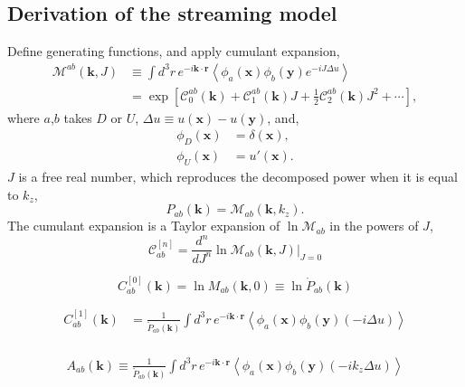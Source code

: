 \documentclass[a4paper,11pt, fleqn]{article}
\begin{document}
\newpage
\subsection{Derivation of the streaming model}


Define generating functions, and apply cumulant expansion,
\begin{align}
  \mathcal{M}^{ab}(\bm{k}, J) &\equiv
  \int \!\! d^3 r \, e^{-i\bm{k}\cdot\bm{r}} \left\langle
  \phi_a(\bm{x}) \phi_b(\bm{y}) e^{-iJ\Delta u} \right\rangle\\
  &= \exp\left[
    \mathcal{C}_0^{ab}(\bm{k}) +
    \mathcal{C}_1^{ab}(\bm{k}) J +
    \frac{1}{2} \mathcal{C}_2^{ab}(\bm{k}) J^2 + \cdots
    \right],
\end{align}
where $a$,$b$ takes $D$ or $U$, $\Delta u \equiv u(\bm{x}) - u(\bm{y})$, and,
\begin{align}
  \phi_D(\bm{x}) &= \delta(\bm{x}),\\
  \phi_U(\bm{x}) &= u'(\bm{x}).
\end{align}
$J$ is a free real number, which reproduces the decomposed power when it is equal to $k_z$,
\begin{equation}
  P_{ab}(\bm{k}) = \mathcal{M}_{ab}(\bm{k}, k_z).
\end{equation}
%
The cumulant expansion is a Taylor expansion of $\ln \mathcal{M}_{ab}$ in the powers of $J$,
%
\begin{equation}
  \mathcal{C}_{ab}^{[n]} = \frac{d^n}{dJ^n}
  \ln \mathcal{M}_{ab}(\bm{k}, J) \Big|_{J=0}
\end{equation}

\begin{equation}
  C_{ab}^{[0]}(\bm{k}) =
  \ln M_{ab}(\bm{k}, 0) \equiv \ln \mathring{P}_{ab}(\bm{k})
\end{equation}

\begin{align}
  C_{ab}^{[1]}(\bm{k}) &= \frac{1}{\mathring{P}_{ab}(\bm{k})}
  \int\!d^3 r \, e^{-i\bm{k}\cdot\bm{r}} \left\langle
  \phi_a(\bm{x}) \phi_b(\bm{y}) (-i \Delta u) \right\rangle\\
\end{align}

\begin{align}
  A_{ab}(\bm{k}) \equiv
  \frac{1}{\mathring{P}_{ab}(\bm{k})}
  \int\!d^3 r \, e^{-i\bm{k}\cdot\bm{r}} \left\langle
  \phi_a(\bm{x}) \phi_b(\bm{y}) (-i k_z \Delta u) \right\rangle\\
\end{align}
\end{document}

